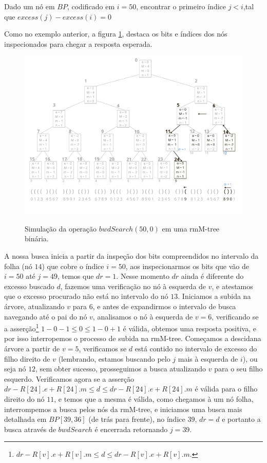     \begin{example}
        Dado um nó em $BP$, codificado em $i=50$, encontrar o primeiro índice $j<i$,tal que $excess(j) - excess(i) = 0$


        Como no exemplo anterior, a figura \ref{fig:bin-bwdSearch}, destaca os bits e índices dos nós inspecionados para chegar a resposta esperada.
        \begin{figure}[h!]
           \centering
             \caption[bwdSearch(50,0).]{Simulação da operação $bwdSearch(50,0)$ em uma rmM-tree binária.}
             \includegraphics[width=\columnwidth]{images/rmm-tree-bin-bwdsearch.png}
             \label{fig:bin-bwdSearch}
        \end{figure}

        A nossa busca inicia a partir da inspeção dos bits compreendidos no intervalo da folha (nó $14$) que cobre o índice $i=50$, aos inspecionarmos os bits que
        vão de $i=50$ até $j=49$, temos que $dr=1$. Nesse momento $dr$ ainda é diferente do excesso buscado $d$, fazemos uma verificação no nó à esquerda 
        de $v$, e atestamos que o excesso procurado não está no intervalo do nó $13$. 
        Iniciamos a subida na árvore, atualizando $v$ para $6$, e antes de expandirmos o intervalo de busca navegando até o pai do nó $v$,
        analisamos o nó à esquerda de $v=6$, verificando se a asserção\footnote{$dr - R[v].e + R[v].m \leq d \leq dr - R[v].e + R[v].m$.} $ 1 -0 -1 \leq 0 \leq 1 -0 +1$
         é válida, obtemos uma resposta positiva, e por isso interropemos o processo de subida na rmM-tree. Começamos a descidana árvore
         a partir de $v=5$, verificamos se $d$ está contido no intervalo de excesso do filho direito de $v$ (lembrando, estamos buscando pelo $j$ mais à esquerda de $i$), 
         ou seja nó $12$, sem obter sucesso, prosseguimos a busca atualizando $v$ para o seu filho esquerdo.
         Verificamos agora se a asserção $dr - R[24].e + R[24].m \leq d \leq dr - R[24].e + R[24].m$ é válida para o filho direito do nó $11$,
         e temos que a mesma é válida, como chegamos à um nó folha, interrompemos a busca pelos nós da rmM-tree,
         e iniciamos uma busca mais detalhada em $BP[39,36]$ (de trás para frente), no índice $39$, $dr=d$ e portanto a busca através de $bwdSearch$ é encerrada retornando $j=39$.
    \end{example}


